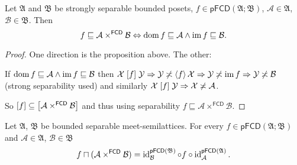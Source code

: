 \begin{thm}\label{pf-im-dom}
Let $\mathfrak{A}$ and $\mathfrak{B}$ be strongly separable bounded posets,
$f\in\mathsf{pFCD}(\mathfrak{A};\mathfrak{B})$, $\mathcal{A}\in\mathfrak{A}$,
$\mathcal{B}\in\mathfrak{B}$. Then
\[
f\sqsubseteq\mathcal{A}\times^{\mathsf{FCD}}\mathcal{B}\Leftrightarrow\operatorname{dom} f\sqsubseteq\mathcal{A}\wedge\operatorname{im} f\sqsubseteq\mathcal{B}.
\]
\end{thm}
\begin{proof}
One direction is the proposition above. The other:

If $\operatorname{dom} f\sqsubseteq\mathcal{A}\wedge\operatorname{im} f\sqsubseteq\mathcal{B}$
then $\mathcal{X}\mathrel{\left[f\right]}\mathcal{Y}\Rightarrow\mathcal{Y}\not\asymp\left\langle f\right\rangle\mathcal{X}\Rightarrow\mathcal{Y}\not\asymp\operatorname{im} f\Rightarrow\mathcal{Y}\not\asymp\mathcal{B}$
(strong separability used)
and similarly $\mathcal{X}\mathrel{\left[f\right]}\mathcal{Y}\Rightarrow\mathcal{X}\not\asymp\mathcal{A}$.

So $\mathord{\mathrel{\left[f\right]}}\subseteq\mathord{\mathrel{\left[\mathcal{A}\times^{\mathsf{FCD}}\mathcal{B}\right]}}$
and thus using separability $f\sqsubseteq\mathcal{A}\times^{\mathsf{FCD}}\mathcal{B}$.\end{proof}
\begin{thm}
Let $\mathfrak{A}$, $\mathfrak{B}$ be bounded separable meet-semilattices. For every $f\in\mathsf{pFCD}(\mathfrak{A};\mathfrak{B})$
and $\mathcal{A}\in\mathfrak{A}$, $\mathcal{B}\in\mathfrak{B}$ 
\[
f\sqcap(\mathcal{A}\times^{\mathsf{FCD}}\mathcal{B})=\operatorname{id}_{\mathcal{B}}^{\mathsf{pFCD}(\mathfrak{B})}\circ f\circ\operatorname{id}_{\mathcal{A}}^{\mathsf{pFCD}(\mathfrak{A})}.
\]
\end{thm}

